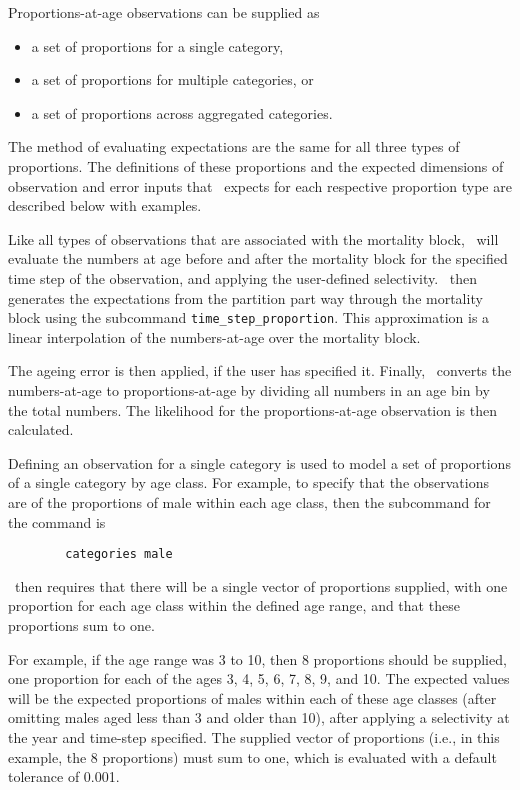 Proportions-at-age observations can be supplied as

\begin{itemize}
	\item a set of proportions for a single category,
	\item a set of proportions for multiple categories, or
	\item a set of proportions across aggregated categories.
\end{itemize}

The method of evaluating expectations are the same for all three types of proportions. The definitions of these proportions and the expected dimensions of observation and error inputs that \CNAME\ expects for each respective proportion type are described below with examples.

Like all types of observations that are associated with the mortality block, \CNAME\ will evaluate the numbers at age before and after the mortality block for the specified time step of the observation, and applying the user-defined selectivity. \CNAME\ then generates the expectations from the partition part way through the mortality block using the subcommand \texttt{time\_step\_proportion}. This approximation is a linear interpolation of the numbers-at-age over the mortality block.

The ageing error is then applied, if the user has specified it. Finally, \CNAME\ converts the numbers-at-age to proportions-at-age by dividing all numbers in an age bin by the total numbers. The likelihood for the proportions-at-age observation is then calculated.

Defining an observation for a single category is used to model a set of proportions of a single category by age class. For example, to specify that the observations are of the proportions of male within each age class, then the subcommand  for the  command is

{\small{\begin{verbatim}
		categories male
		\end{verbatim}}}

\CNAME\ then requires that there will be a single vector of proportions supplied, with one proportion for each age class within the defined age range, and that these proportions sum to one.

For example, if the age range was 3 to 10, then 8 proportions should be supplied, one proportion for each of the ages 3, 4, 5, 6, 7, 8, 9, and 10. The expected values will be the expected proportions of males within each of these age classes (after omitting males aged less than 3 and older than 10), after applying a selectivity at the year and time-step specified. The supplied vector of proportions (i.e., in this example, the 8 proportions) must sum to one, which is evaluated with a default tolerance of 0.001.

